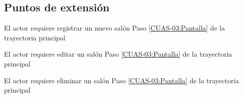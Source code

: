 \subsection{Puntos de extensión}
%
\UCExtensionPoint
{El actor requiere registrar un nuevo salón}
{ Paso \ref{CUAS-03:Pantalla} de la trayectoria principal}
{}

\UCExtensionPoint
{El actor requiere editar un salón}
{ Paso \ref{CUAS-03:Pantalla} de la trayectoria principal}
{}

\UCExtensionPoint
{El actor requiere eliminar un salón}
{ Paso \ref{CUAS-03:Pantalla} de la trayectoria principal}
{}
%
 